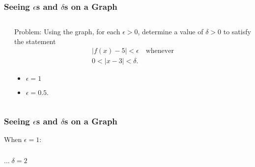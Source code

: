 \documentclass[14pt]{beamer}
\begin{document}
\begin{frame}
\frametitle{Seeing $\epsilon$s and $\delta$s on a Graph}
\begin{columns}[T]
	\begin{column}{.5\textwidth}
		\begin{block}
		\end{block}
	\end{column}
	\begin{column}{.5\textwidth}
		\begin{block}
		{Problem:} \footnotesize Using the graph, for each $\epsilon >0$, determine a value of $\delta>0$ to satisfy the statement 
		\begin{multline*}|f(x)-5|<\epsilon\quad\text{whenever} \\
			0<|x-3|<\delta.\end{multline*}  
		\vspace{-1pc}
		\begin{itemize}
		\item $\epsilon=1$ 
		\item $\epsilon=0.5$.
		\end{itemize}
		\end{block}
	\end{column}
\end{columns}
\end{frame} 

\begin{frame}
\frametitle{Seeing $\epsilon$s and $\delta$s on a Graph}
\small When $\epsilon=1$:

\vspace{-1pc}
\begin{columns}[T]
\begin{column}{.5\textwidth}
\begin{block}
\end{block}
\end{column}
\begin{column}{.5\textwidth}
\begin{block}
\end{block}
\end{column}
\end{columns}
\vspace{-1pc}
\flushright $\dots\;\delta=2$
\end{frame}
\end{document}

